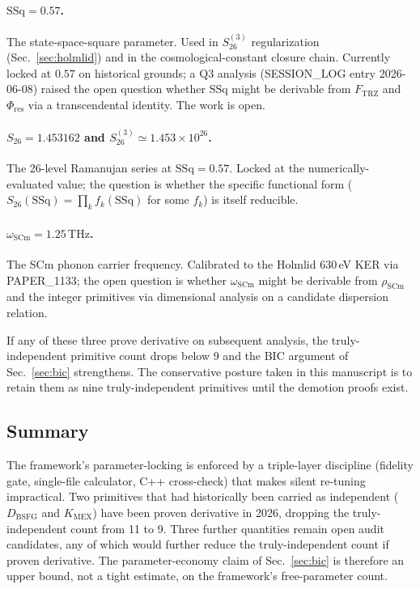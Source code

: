\paragraph{$\mathrm{SSq} = 0.57$.}
The state-space-square parameter. Used in $S_{26}^{(3)}$ regularization
(Sec.~\ref{sec:holmlid}) and in the cosmological-constant closure
chain. Currently locked at $0.57$ on historical grounds; a Q3
analysis (SESSION\_LOG entry 2026-06-08) raised the open question
whether $\mathrm{SSq}$ might be derivable from $F_{\text{TRZ}}$ and
$\Phi_{\text{res}}$ via a transcendental identity. The work is open.

\paragraph{$S_{26} = 1.453162$ and $S_{26}^{(3)} \simeq 1.453 \times 10^{26}$.}
The 26-level Ramanujan series at $\mathrm{SSq} = 0.57$. Locked at
the numerically-evaluated value; the question is whether the
specific functional form
($S_{26}(\mathrm{SSq}) = \prod_{k} f_k(\mathrm{SSq})$ for some
$f_k$) is itself reducible.

\paragraph{$\omega_{\text{SCm}} = 1.25\,\mathrm{THz}$.}
The SCm phonon carrier frequency. Calibrated to the Holmlid 630\,eV
KER via PAPER\_1133; the open question is whether
$\omega_{\text{SCm}}$ might be derivable from $\rho_{\text{SCm}}$
and the integer primitives via dimensional analysis on a candidate
dispersion relation.

If any of these three prove derivative on subsequent analysis, the
truly-independent primitive count drops below 9 and the BIC
argument of Sec.~\ref{sec:bic} strengthens. The conservative
posture taken in this manuscript is to retain them as nine
truly-independent primitives until the demotion proofs exist.

\subsection{Summary}

The framework's parameter-locking is enforced by a triple-layer
discipline (fidelity gate, single-file calculator, C++ cross-check)
that makes silent re-tuning impractical. Two primitives that had
historically been carried as independent ($D_{\text{BSFG}}$ and
$K_{\text{MEX}}$) have been proven derivative in 2026, dropping the
truly-independent count from 11 to 9. Three further quantities
remain open audit candidates, any of which would further reduce the
truly-independent count if proven derivative. The
parameter-economy claim of Sec.~\ref{sec:bic} is therefore an
upper bound, not a tight estimate, on the framework's free-parameter
count.

